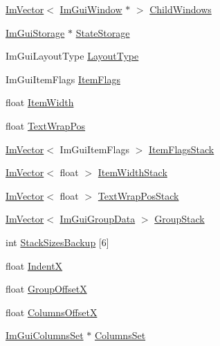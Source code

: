 \begin{DoxyCompactItemize}
\item 
\hyperlink{class_im_vector}{Im\+Vector}$<$ \hyperlink{struct_im_gui_window}{Im\+Gui\+Window} $\ast$ $>$ \hyperlink{struct_im_gui_draw_context_a70dc80b69c2a4e5fae4009300fe525a5}{Child\+Windows}
\item 
\hyperlink{struct_im_gui_storage}{Im\+Gui\+Storage} $\ast$ \hyperlink{struct_im_gui_draw_context_a507947c789f377ba13767061557fd348}{State\+Storage}
\item 
Im\+Gui\+Layout\+Type \hyperlink{struct_im_gui_draw_context_a8516b32e30504c3037d34e93b7988d83}{Layout\+Type}
\item 
Im\+Gui\+Item\+Flags \hyperlink{struct_im_gui_draw_context_a8581650b6011e19f09b12b8bc50a51f5}{Item\+Flags}
\item 
float \hyperlink{struct_im_gui_draw_context_a6327a65273ded49b6aa309167fca4b9e}{Item\+Width}
\item 
float \hyperlink{struct_im_gui_draw_context_a0488b6a84b2f26ddd536fef2ae3f96c3}{Text\+Wrap\+Pos}
\item 
\hyperlink{class_im_vector}{Im\+Vector}$<$ Im\+Gui\+Item\+Flags $>$ \hyperlink{struct_im_gui_draw_context_a895d75185a81dc21bb6153090ab5b018}{Item\+Flags\+Stack}
\item 
\hyperlink{class_im_vector}{Im\+Vector}$<$ float $>$ \hyperlink{struct_im_gui_draw_context_af6420717337b44394ad7ccbe55446db2}{Item\+Width\+Stack}
\item 
\hyperlink{class_im_vector}{Im\+Vector}$<$ float $>$ \hyperlink{struct_im_gui_draw_context_ac282b2f910a8846f4c200c358974b12a}{Text\+Wrap\+Pos\+Stack}
\item 
\hyperlink{class_im_vector}{Im\+Vector}$<$ \hyperlink{struct_im_gui_group_data}{Im\+Gui\+Group\+Data} $>$ \hyperlink{struct_im_gui_draw_context_aa775f16a46bdfe8e131e25cab733afe0}{Group\+Stack}
\item 
int \hyperlink{struct_im_gui_draw_context_aedfc8e281f1d72c7c1882c36bebb00d1}{Stack\+Sizes\+Backup} \mbox{[}6\mbox{]}
\item 
float \hyperlink{struct_im_gui_draw_context_a3697085dca9164ca840d1fb1d52c8a66}{IndentX}
\item 
float \hyperlink{struct_im_gui_draw_context_a30473e3e4b3eeba6c8d1acdaaedecba9}{Group\+OffsetX}
\item 
float \hyperlink{struct_im_gui_draw_context_af8be098e7ddd1885343725f3fd61ce4a}{Columns\+OffsetX}
\item 
\hyperlink{struct_im_gui_columns_set}{Im\+Gui\+Columns\+Set} $\ast$ \hyperlink{struct_im_gui_draw_context_a7c9cf59580945944f84885ba91186ee3}{Columns\+Set}
\end{DoxyCompactItemize}


